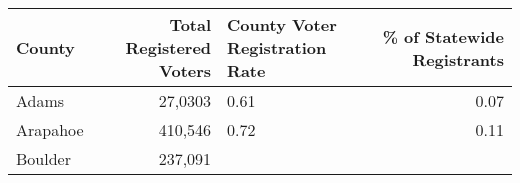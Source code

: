 \documentclass[12pt,twoside]{reedthesis}
\begin{document}
  \begin{longtable}[]{@{}lrlr@{}}
  \toprule
  \begin{minipage}[b]{0.10\columnwidth}\raggedright\strut
  County\strut
  \end{minipage} & \begin{minipage}[b]{0.23\columnwidth}\raggedleft\strut
  Total Registered Voters\strut
  \end{minipage} & \begin{minipage}[b]{0.30\columnwidth}\raggedright\strut
  County Voter Registration Rate\strut
  \end{minipage} & \begin{minipage}[b]{0.26\columnwidth}\raggedleft\strut
  \% of Statewide Registrants\strut
  \end{minipage}\tabularnewline
  \midrule
  \endhead
  \begin{minipage}[t]{0.10\columnwidth}\raggedright\strut
  Adams\strut
  \end{minipage} & \begin{minipage}[t]{0.23\columnwidth}\raggedleft\strut
  27,0303\strut
  \end{minipage} & \begin{minipage}[t]{0.30\columnwidth}\raggedright\strut
  0.61\strut
  \end{minipage} & \begin{minipage}[t]{0.26\columnwidth}\raggedleft\strut
  0.07\strut
  \end{minipage}\tabularnewline
  \begin{minipage}[t]{0.10\columnwidth}\raggedright\strut
  Arapahoe\strut
  \end{minipage} & \begin{minipage}[t]{0.23\columnwidth}\raggedleft\strut
  410,546\strut
  \end{minipage} & \begin{minipage}[t]{0.30\columnwidth}\raggedright\strut
  0.72\strut
  \end{minipage} & \begin{minipage}[t]{0.26\columnwidth}\raggedleft\strut
  0.11\strut
  \end{minipage}\tabularnewline
  \begin{minipage}[t]{0.10\columnwidth}\raggedright\strut
  Boulder\strut
  \end{minipage} & \begin{minipage}[t]{0.23\columnwidth}\raggedleft\strut
  237,091\strut
  \end{minipage} & \begin{minipage}[t]{0.30\columnwidth}\raggedright\strut

\end{minipage}
\end{longtable}
\end{document}

